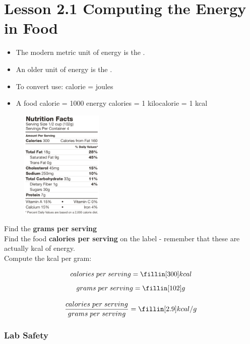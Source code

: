 \documentclass[12pt]{exam}
\begin{document}
\section*{Lesson 2.1 Computing the Energy in Food}

\begin{itemize}
    \item The modern metric unit of energy is the \fillin[joule]. 
    \item An older unit of energy is the \fillin[calorie].
    \item To convert use: \fillin[1] calorie = \fillin[4.2] joules
    \item A food calorie = 1000 energy calories = 1 kilocalorie = 1 kcal
\end{itemize}
    

\begin{figure} %
    \centering
    \includegraphics[width=0.35\textwidth]{food_label.png}
\end{figure}


Find the \textbf{grams per serving} \\ 

Find the food \textbf{calories per serving} on the label - remember that these are actually kcal of energy. \\

Compute the kcal per gram:

$$ calories \; per \; serving = \fillin[300] kcal $$
$$ grams \; per \; serving = \fillin[102] g $$

$$ \frac{calories \; per \; serving}{grams \; per \; serving} = \fillin[2.9] kcal/g  $$


\vspace{.1cm}

\subsubsection*{Lab Safety}
\end{document}
